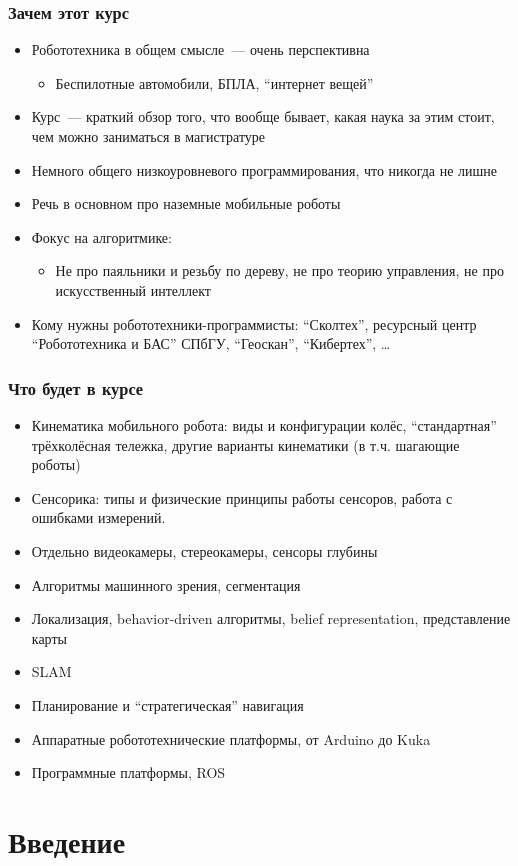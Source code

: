 \documentclass{../../slides-style}
\begin{document}
    \begin{frame}
        \frametitle{Зачем этот курс}
        \begin{itemize}
            \item Робототехника в общем смысле~--- очень перспективна
            \begin{itemize}
                \item Беспилотные автомобили, БПЛА, \enquote{интернет вещей}
            \end{itemize}
            \item Курс~--- краткий обзор того, что вообще бывает, какая наука за этим стоит, чем можно заниматься в магистратуре
            \item Немного общего низкоуровневого программирования, что никогда не лишне
            \item Речь в основном про наземные мобильные роботы
            \item Фокус на алгоритмике:
            \begin{itemize}
                \item Не про паяльники и резьбу по дереву, не про теорию управления, не про искусственный интеллект
            \end{itemize}
            \item Кому нужны робототехники-программисты: \enquote{Сколтех}, ресурсный центр \enquote{Робототехника и БАС} СПбГУ, \enquote{Геоскан}, \enquote{Кибертех}, \dots
        \end{itemize}
    \end{frame}

    \begin{frame}
        \frametitle{Что будет в курсе}
        \begin{itemize}
            \item Кинематика мобильного робота: виды и конфигурации колёс, \enquote{стандартная} трёхколёсная тележка, другие варианты кинематики (в т.ч. шагающие роботы)
            \item Сенсорика: типы и физические принципы работы сенсоров, работа с ошибками измерений.
            \item Отдельно видеокамеры, стереокамеры, сенсоры глубины
            \item Алгоритмы машинного зрения, сегментация
            \item Локализация, behavior-driven алгоритмы, belief representation, представление карты
            \item SLAM
            \item Планирование и \enquote{стратегическая} навигация
            \item Аппаратные робототехнические платформы, от Arduino до Kuka
            \item Программные платформы, ROS
        \end{itemize}
    \end{frame}

    \section{Введение}
\end{document}

